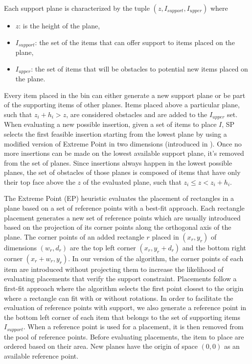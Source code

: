 Each support plane is characterized by the tuple $(z, I_{support}, I_{upper})$ where
\begin{itemize}
    \item $z$: is the height of the plane,
    \item $I_{support}$: the set of the items that can offer support to items placed on the plane,
    \item $I_{upper}$: the set of items that will be obstacles to potential new items placed on the plane.
\end{itemize}

Every item placed in the bin can either generate a new support plane or be part of the supporting items of other planes. 
Items placed above a particular plane, such that $z_i + h_i > z$, are considered obstacles and are added to the $I_{upper}$ set.
When evaluating a new possible insertion, given a set of items to place $I$, SP selects the first feasible insertion starting from the lowest plane by using a modified version of Extreme Point in two dimensions (introduced in \cite{crainic2008extreme}).
Once no more insertions can be made on the lowest available support plane, it's removed from the set of planes.
Since insertions always happen in the lowest possible planes, the set of obstacles of those planes is composed of items that have only their top face above the $z$ of the evaluated plane, such that $z_i \le z < z_i + h_i$.

The Extreme Point (EP) heuristic evaluates the placement of rectangles in a plane based on a set of reference points with a best-fit approach. 
Each rectangle placement generates a new set of reference points which are usually introduced based on the projection of its corner points along the orthogonal axis of the plane.
The corner points of an added rectangle $r$ placed in $(x_r, y_r)$ of dimensions $(w_r, d_r)$ are the top left corner $(x_r, y_r + d_r)$ and the bottom right corner $(x_r + w_r, y_r)$.
In our version of the algorithm, the corner points of each item are introduced without projecting them to increase the likelihood of evaluating placements that verify the support constraint.
Placements follow a first-fit approach where the algorithm selects the first point closest to the origin where a rectangle can fit with or without rotations.
In order to facilitate the evaluation of reference points with support, we also generate a reference point in the bottom left corner of each item that belongs to the set of supporting items $I_{support}$.
When a reference point is used for a placement, it is then removed from the pool of reference points.
Before evaluating placements, the item to place are ordered based on their area.
New planes have the origin of space $(0,0)$ as an available reference point.

